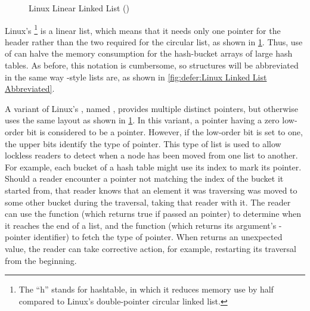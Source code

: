 \begin{figure}
\centering
{}
\caption{Linux Linear Linked List ()}
\label{fig:defer:Linux Linear Linked List (hlist)}
\end{figure}

Linux's \footnote{
	The ``h'' stands for hashtable, in which it reduces memory
	use by half compared to Linux's double-pointer circular
	linked list.}
is a linear list, which means that
it needs only one pointer for the header rather than the two
required for the circular list, as shown in
\cref{fig:defer:Linux Linear Linked List (hlist)}.
Thus, use of  can halve the memory consumption for the hash-bucket
arrays of large hash tables.
As before, this notation is cumbersome, so  structures will
be abbreviated in the same way -style lists are, as shown in
\cref{fig:defer:Linux Linked List Abbreviated}.

A variant of Linux's , named , provides multiple
distinct  pointers, but otherwise uses the same layout as shown in
\cref{fig:defer:Linux Linear Linked List (hlist)}.
In this variant, a  pointer having a zero low-order bit is
considered to be a pointer.
However, if the low-order bit is set to one, the upper bits identify
the type of  pointer.
This type of list is used to allow lockless readers to detect when a
node has been moved from one list to another.
For example, each bucket of a hash table might use its index to mark
its  pointer.
Should a reader encounter a  pointer not matching the index of
the bucket it started from, that reader knows that an element it was
traversing was moved to some other bucket during the traversal, taking
that reader with it.
The reader can use the  function (which returns true
if passed an   pointer) to determine when
it reaches the end of a list, and the  function
(which returns its argument's -pointer identifier) to fetch
the type of  pointer.
When  returns an unexpected value, the reader
can take corrective action, for example, restarting its traversal from
the beginning.

